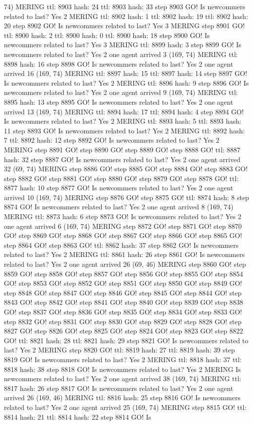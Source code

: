 74) MERING ttl: 8903 hash: 24 ttl: 8903 hash: 33 step 8903 GO! Is newcommers related to last? Yes 2 MERING ttl: 8902 hash: 1 ttl: 8902 hash: 19 ttl: 8902 hash: 20 step 8902 GO! Is newcommers related to last? Yes 3 MERING step 8901 GO! ttl: 8900 hash: 2 ttl: 8900 hash: 0 ttl: 8900 hash: 18 step 8900 GO! Is newcommers related to last? Yes 3 MERING ttl: 8899 hash: 3 step 8899 GO! Is newcommers related to last? Yes 2 one agent arrived 3 (169, 74) MERING ttl: 8898 hash: 16 step 8898 GO! Is newcommers related to last? Yes 2 one agent arrived 16 (169, 74) MERING ttl: 8897 hash: 15 ttl: 8897 hash: 14 step 8897 GO! Is newcommers related to last? Yes 2 MERING ttl: 8896 hash: 9 step 8896 GO! Is newcommers related to last? Yes 2 one agent arrived 9 (169, 74) MERING ttl: 8895 hash: 13 step 8895 GO! Is newcommers related to last? Yes 2 one agent arrived 13 (169, 74) MERING ttl: 8894 hash: 17 ttl: 8894 hash: 4 step 8894 GO! Is newcommers related to last? Yes 2 MERING ttl: 8893 hash: 5 ttl: 8893 hash: 11 step 8893 GO! Is newcommers related to last? Yes 2 MERING ttl: 8892 hash: 7 ttl: 8892 hash: 12 step 8892 GO! Is newcommers related to last? Yes 2 MERING step 8891 GO! step 8890 GO! step 8889 GO! step 8888 GO! ttl: 8887 hash: 32 step 8887 GO! Is newcommers related to last? Yes 2 one agent arrived 32 (69, 74) MERING step 8886 GO! step 8885 GO! step 8884 GO! step 8883 GO! step 8882 GO! step 8881 GO! step 8880 GO! step 8879 GO! step 8878 GO! ttl: 8877 hash: 10 step 8877 GO! Is newcommers related to last? Yes 2 one agent arrived 10 (169, 74) MERING step 8876 GO! step 8875 GO! ttl: 8874 hash: 8 step 8874 GO! Is newcommers related to last? Yes 2 one agent arrived 8 (169, 74) MERING ttl: 8873 hash: 6 step 8873 GO! Is newcommers related to last? Yes 2 one agent arrived 6 (169, 74) MERING step 8872 GO! step 8871 GO! step 8870 GO! step 8869 GO! step 8868 GO! step 8867 GO! step 8866 GO! step 8865 GO! step 8864 GO! step 8863 GO! ttl: 8862 hash: 37 step 8862 GO! Is newcommers related to last? Yes 2 MERING ttl: 8861 hash: 26 step 8861 GO! Is newcommers related to last? Yes 2 one agent arrived 26 (69, 46) MERING step 8860 GO! step 8859 GO! step 8858 GO! step 8857 GO! step 8856 GO! step 8855 GO! step 8854 GO! step 8853 GO! step 8852 GO! step 8851 GO! step 8850 GO! step 8849 GO! step 8848 GO! step 8847 GO! step 8846 GO! step 8845 GO! step 8844 GO! step 8843 GO! step 8842 GO! step 8841 GO! step 8840 GO! step 8839 GO! step 8838 GO! step 8837 GO! step 8836 GO! step 8835 GO! step 8834 GO! step 8833 GO! step 8832 GO! step 8831 GO! step 8830 GO! step 8829 GO! step 8828 GO! step 8827 GO! step 8826 GO! step 8825 GO! step 8824 GO! step 8823 GO! step 8822 GO! ttl: 8821 hash: 28 ttl: 8821 hash: 29 step 8821 GO! Is newcommers related to last? Yes 2 MERING step 8820 GO! ttl: 8819 hash: 27 ttl: 8819 hash: 39 step 8819 GO! Is newcommers related to last? Yes 2 MERING ttl: 8818 hash: 37 ttl: 8818 hash: 38 step 8818 GO! Is newcommers related to last? Yes 2 MERING Is newcommers related to last? Yes 2 one agent arrived 38 (169, 74) MERING ttl: 8817 hash: 26 step 8817 GO! Is newcommers related to last? Yes 2 one agent arrived 26 (169, 46) MERING ttl: 8816 hash: 25 step 8816 GO! Is newcommers related to last? Yes 2 one agent arrived 25 (169, 74) MERING step 8815 GO! ttl: 8814 hash: 21 ttl: 8814 hash: 22 step 8814 GO! Is 